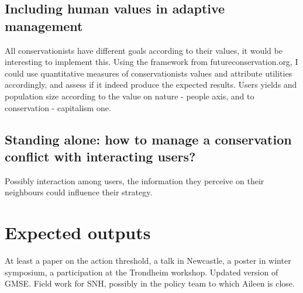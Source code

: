 \documentclass[12pt,a4paper]{article}
\begin{document}
\subsection{Including human values in adaptive management}

All conservationists have different goals according to their values, it would be interesting to implement this. Using the framework from futureconservation.org, I could use quantitative measures of conservationists values and attribute utilities accordingly, and assess if it indeed produce the expected results. Users yields and population size according to the value on nature - people axis, and to conservation - capitalism one. 

\subsection{Standing alone: how to manage a conservation conflict with interacting users?}

Possibly interaction among users, the information they perceive on their neighbours could influence their strategy.

\section{Expected outputs}

At least a paper on the action threshold, a talk in Newcastle, a poster in winter symposium, a participation at the Trondheim workshop. Updated version of GMSE. Field work for SNH, possibly in the policy team to which Aileen is close.

\newpage

\nocite{*}
\end{document}
